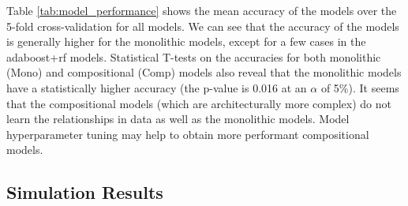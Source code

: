 Table \ref{tab:model_performance} shows the mean accuracy of the models over the 5-fold cross-validation for all models. We can see that the accuracy of the models is generally higher for the monolithic models, except for a few cases in the \gls{adaboost}+\gls{rf} models. Statistical T-tests on the accuracies for both monolithic (Mono)  and compositional (Comp)  models also reveal that the monolithic models have a statistically higher accuracy (the p-value is 0.016 at an $\alpha$ of 5\%). It seems that the compositional models (which are architecturally more complex) do not learn the relationships in data as well as the monolithic models. Model hyperparameter tuning may help to obtain more performant compositional models. 


\subsection{Simulation Results}
\label{sec:enforcer_results}



